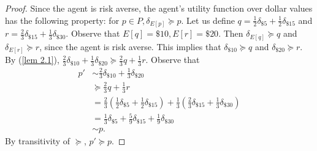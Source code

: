 \documentclass[12pt]{article}
\theoremstyle{definition}
\theoremstyle{remark}
\begin{document}
\begin{proof}
  Since the agent is risk averse, the agent's utility function over dollar values has the following property: for $p \in P, \delta_{E[p]} \succeq p$. Let us define $q = \frac{1}{2}\delta_{\$ 5} + \frac{1}{2}\delta_{\$ 15}$ and $r = \frac{2}{3}\delta_{\$ 15} + \frac{1}{3}\delta_{\$ 30}$.
  Observe that $E[q] = \$ 10, E[r] = \$ 20$. Then $\delta_{E[q]} \succeq q$ and $\delta_{E[r]} \succeq r$, since the agent is risk averse. This implies that $\delta_{\$ 10} \succeq q$ and $\delta_{\$ 20} \succeq r$.
  By (\ref{lem 2.1}), $\frac{2}{3}\delta_{\$ 10} + \frac{1}{3}\delta_{\$ 20} \succeq \frac{2}{3}q + \frac{1}{3}r$.
  Observe that
  \begin{align*}
    p' &\sim \frac{2}{3}\delta_{\$ 10} + \frac{1}{3}\delta_{\$ 20} \\
    &\succeq \frac{2}{3}q + \frac{1}{3}r \\
    &= \frac{2}{3}(\frac{1}{2}\delta_{\$ 5} + \frac{1}{2}\delta_{\$ 15}) + \frac{1}{3}(\frac{2}{3}\delta_{\$ 15} + \frac{1}{3}\delta_{\$ 30}) \\
    &= \frac{1}{3}\delta_{\$ 5} + \frac{5}{9}\delta_{\$ 15} + \frac{1}{9}\delta_{\$ 30} \\
    &\sim p.
  \end{align*}
  By transitivity of $\succeq$, $p' \succeq p$.
\end{proof}
%
%
\end{document}
